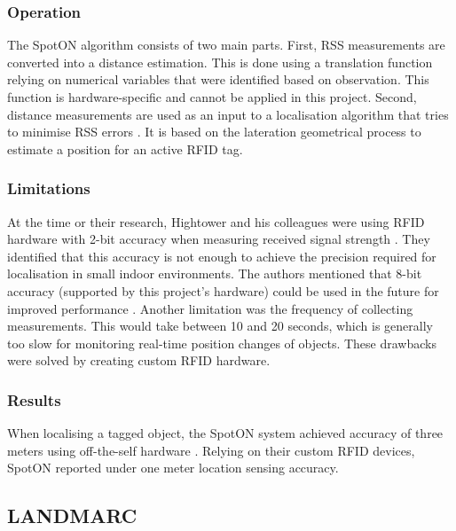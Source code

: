 \subsubsection{Operation}

The SpotON algorithm consists of two main parts. First, RSS measurements are converted into a distance estimation. This is done using a translation function relying on numerical variables that were identified based on observation. This function is hardware-specific and cannot be applied in this project. Second, distance measurements are used as an input to a localisation algorithm that tries to minimise RSS errors \cite{Hightower2000}. It is based on the lateration geometrical process to estimate a position for an active RFID tag.

\subsubsection{Limitations}

At the time or their research, Hightower and his colleagues were using RFID hardware with 2-bit accuracy when measuring received signal strength \cite{Hightower2000}. They identified that this accuracy is not enough to achieve the precision required for localisation in small indoor environments. The authors mentioned that 8-bit accuracy (supported by this project's hardware) could be used in the future for improved performance \cite{Hightower2000}. Another limitation was the frequency of collecting measurements. This would take between 10 and 20 seconds, which is generally too slow for monitoring real-time position changes of objects. These drawbacks were solved by creating custom RFID hardware.

\subsubsection{Results}

When localising a tagged object, the SpotON system achieved accuracy of three meters using off-the-self hardware \cite{Hightower2000}. Relying on their custom RFID devices, SpotON reported under one meter location sensing accuracy.


\subsection{LANDMARC}

